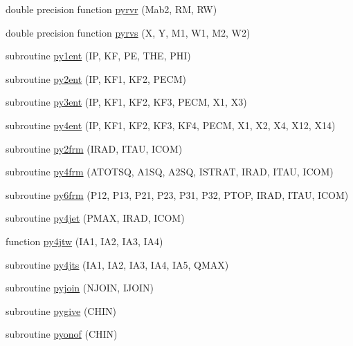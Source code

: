 \begin{DoxyCompactItemize}
\item 
double precision function \hyperlink{pythia-6_84_824_8f_a5168f5ce45865125ee90d4a1967db80d}{pyrvr} (Mab2, R\+M, R\+W)
\item 
double precision function \hyperlink{pythia-6_84_824_8f_a78f4bff902221f0851a474a0642ca924}{pyrvs} (X, Y, M1, W1, M2, W2)
\item 
subroutine \hyperlink{pythia-6_84_824_8f_aa755c1ad09318a6b86ba9c501c7fcb3b}{py1ent} (I\+P, K\+F, P\+E, T\+H\+E, P\+H\+I)
\item 
subroutine \hyperlink{pythia-6_84_824_8f_a2b9b48d65354953ca74e6e3571daf5d4}{py2ent} (I\+P, K\+F1, K\+F2, P\+E\+C\+M)
\item 
subroutine \hyperlink{pythia-6_84_824_8f_a236783c5902cb61da4d1d5ce4491e2fe}{py3ent} (I\+P, K\+F1, K\+F2, K\+F3, P\+E\+C\+M, X1, X3)
\item 
subroutine \hyperlink{pythia-6_84_824_8f_a30fa8bc62ece593663313208df32aa2b}{py4ent} (I\+P, K\+F1, K\+F2, K\+F3, K\+F4, P\+E\+C\+M, X1, X2, X4, X12, X14)
\item 
subroutine \hyperlink{pythia-6_84_824_8f_a6b02d5cc105a9871f1c5ee4c46752de9}{py2frm} (I\+R\+A\+D, I\+T\+A\+U, I\+C\+O\+M)
\item 
subroutine \hyperlink{pythia-6_84_824_8f_a61f65c14f7304ed635d9340e3be049e1}{py4frm} (A\+T\+O\+T\+S\+Q, A1\+S\+Q, A2\+S\+Q, I\+S\+T\+R\+A\+T, I\+R\+A\+D, I\+T\+A\+U, I\+C\+O\+M)
\item 
subroutine \hyperlink{pythia-6_84_824_8f_a4ad3701c19e37e48400c694e52649e0f}{py6frm} (P12, P13, P21, P23, P31, P32, P\+T\+O\+P, I\+R\+A\+D, I\+T\+A\+U, I\+C\+O\+M)
\item 
subroutine \hyperlink{pythia-6_84_824_8f_a050131d873ec9273038b54fda8ccc6c1}{py4jet} (P\+M\+A\+X, I\+R\+A\+D, I\+C\+O\+M)
\item 
function \hyperlink{pythia-6_84_824_8f_a68f57cb4807f20b58a861f7be483cf9c}{py4jtw} (I\+A1, I\+A2, I\+A3, I\+A4)
\item 
subroutine \hyperlink{pythia-6_84_824_8f_a6035a797526aac4beb1aec91a7e87d21}{py4jts} (I\+A1, I\+A2, I\+A3, I\+A4, I\+A5, Q\+M\+A\+X)
\item 
subroutine \hyperlink{pythia-6_84_824_8f_aad4645f8cdf9341ed2407e47f5955fb9}{pyjoin} (N\+J\+O\+I\+N, I\+J\+O\+I\+N)
\item 
subroutine \hyperlink{pythia-6_84_824_8f_a23504218b9f527cdb0d3421ecde9852e}{pygive} (C\+H\+I\+N)
\item 
subroutine \hyperlink{pythia-6_84_824_8f_a945a04962dcdcfed06ffe234a5ec1880}{pyonof} (C\+H\+I\+N)

\end{DoxyCompactItemize}
